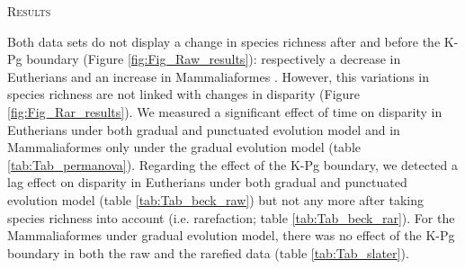 \documentclass[12pt,letterpaper]{article}
\renewcommand{\section}[1]{%
\bigskip
\begin{center}
\begin{Large}
\normalfont\scshape #1
\medskip
\end{Large}
\end{center}}
\begin{document}
%
%

\section{Results}
Both data sets do not display a change in species richness after and before the K-Pg boundary (Figure \ref{fig:Fig_Raw_results}): respectively a decrease in Eutherians \citep[data from][]{beckancient2014} and an increase in Mammaliaformes \citep[data from][]{Slater2012MEE}.
However, this variations in species richness are not linked with changes in disparity (Figure \ref{fig:Fig_Rar_results}).
We measured a significant effect of time on disparity in Eutherians under both gradual and punctuated evolution model and in Mammaliaformes only under the gradual evolution model (table \ref{tab:Tab_permanova}).
Regarding the effect of the K-Pg boundary, we detected a lag effect on disparity in Eutherians under both gradual and punctuated evolution model (table \ref{tab:Tab_beck_raw}) but not any more after taking species richness into account (i.e. rarefaction; table \ref{tab:Tab_beck_rar}).
For the Mammaliaformes under gradual evolution model, there was no effect of the K-Pg boundary in both the raw and the rarefied data (table \ref{tab:Tab_slater}).
\end{document}
